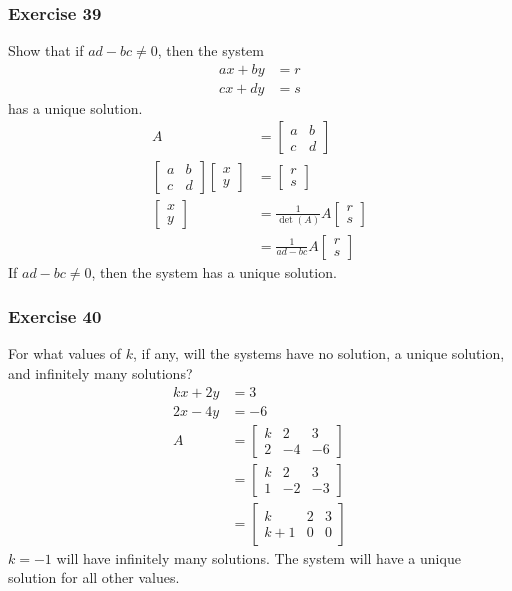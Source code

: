 \documentclass{math}
\begin{document}
\subsubsection*{Exercise 39}
Show that if \( ad-bc \ne 0 \), then the system
\begin{align*}
  ax+by &= r \\
  cx+dy &= s
\end{align*}
has a unique solution.
\begin{align*}
  A &= \begin{bmatrix}a & b \\ c & d\end{bmatrix} \\
  \begin{bmatrix}a & b \\ c & d\end{bmatrix}
    \begin{bmatrix}x \\ y\end{bmatrix} &= \begin{bmatrix}r \\ s\end{bmatrix} \\
  \begin{bmatrix}x \\ y\end{bmatrix} &= \frac{1}{\det(A)}A
    \begin{bmatrix}r \\ s\end{bmatrix} \\
  &= \frac{1}{ad-bc}A\begin{bmatrix}r \\ s\end{bmatrix}
\end{align*}
If \( ad-bc \ne 0 \), then the system has a unique solution.

\subsubsection*{Exercise 40}
For what values of \( k \), if any, will the systems have no solution, a unique
solution, and infinitely many solutions?
\begin{align*}
  kx+2y &= 3 \\
  2x-4y &= -6 \\
  A &= \begin{bmatrix}
    k & 2 & 3 \\
    2 & -4 & -6
  \end{bmatrix} \\
  &= \begin{bmatrix}
    k & 2 & 3 \\
    1 & -2 & -3
  \end{bmatrix} \\
  &= \begin{bmatrix}
    k & 2 & 3 \\
    k+1 & 0 & 0
  \end{bmatrix}
\end{align*}
\( k = -1 \) will have infinitely many solutions. The system will have a unique
solution for all other values.
\end{document}
